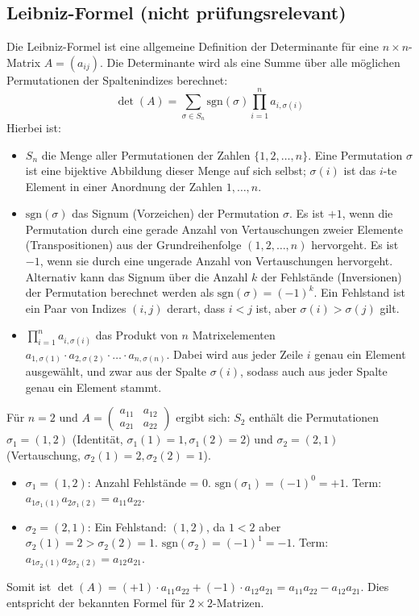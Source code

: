 \subsection{Leibniz-Formel (nicht prüfungsrelevant)}

Die Leibniz-Formel ist eine allgemeine Definition der Determinante für eine $n
    \times n$-Matrix $A=(a_{ij})$. Die Determinante wird als eine Summe über alle
möglichen Permutationen der Spaltenindizes berechnet:
\[ \det(A) = \sum_{\sigma \in S_n} \text{sgn}(\sigma) \prod_{i=1}^{n} a_{i, \sigma(i)} \]
Hierbei ist:
\begin{itemize}
    \item $S_n$ die Menge aller Permutationen der Zahlen $\{1, 2, \ldots, n\}$. Eine Permutation $\sigma$ ist eine bijektive Abbildung dieser Menge auf sich selbst; $\sigma(i)$ ist das $i$-te Element in einer Anordnung der Zahlen $1, \ldots, n$.
    \item $\text{sgn}(\sigma)$ das Signum (Vorzeichen) der Permutation $\sigma$. Es ist $+1$, wenn die Permutation durch eine gerade Anzahl von Vertauschungen zweier Elemente (Transpositionen) aus der Grundreihenfolge $(1, 2, \ldots, n)$ hervorgeht. Es ist $-1$, wenn sie durch eine ungerade Anzahl von Vertauschungen hervorgeht. Alternativ kann das Signum über die Anzahl $k$ der Fehlstände (Inversionen) der Permutation berechnet werden als $\text{sgn}(\sigma) = (-1)^k$. Ein Fehlstand ist ein Paar von Indizes $(i,j)$ derart, dass $i < j$ ist, aber $\sigma(i) > \sigma(j)$ gilt.
    \item $\prod_{i=1}^{n} a_{i, \sigma(i)}$ das Produkt von $n$ Matrixelementen $a_{1, \sigma(1)} \cdot a_{2, \sigma(2)} \cdot \ldots \cdot a_{n, \sigma(n)}$. Dabei wird aus jeder Zeile $i$ genau ein Element ausgewählt, und zwar aus der Spalte $\sigma(i)$, sodass auch aus jeder Spalte genau ein Element stammt.
\end{itemize}
Für $n=2$ und $A = \begin{pmatrix} a_{11} & a_{12} \\ a_{21} & a_{22} \end{pmatrix}$ ergibt sich: $S_2$ enthält die Permutationen $\sigma_1 = (1,2)$ (Identität, $\sigma_1(1)=1, \sigma_1(2)=2$) und $\sigma_2 = (2,1)$ (Vertauschung, $\sigma_2(1)=2, \sigma_2(2)=1$).
\begin{itemize}
    \item $\sigma_1 = (1,2)$: Anzahl Fehlstände = 0. $\text{sgn}(\sigma_1)=(-1)^0=+1$. Term: $a_{1\sigma_1(1)}a_{2\sigma_1(2)} = a_{11}a_{22}$.
    \item $\sigma_2 = (2,1)$: Ein Fehlstand: $(1,2)$, da $1<2$ aber $\sigma_2(1)=2 > \sigma_2(2)=1$. $\text{sgn}(\sigma_2)=(-1)^1=-1$. Term: $a_{1\sigma_2(1)}a_{2\sigma_2(2)} = a_{12}a_{21}$.
\end{itemize}
Somit ist $\det(A) = (+1) \cdot a_{11}a_{22} + (-1) \cdot a_{12}a_{21} = a_{11}a_{22} - a_{12}a_{21}$. Dies entspricht der bekannten Formel für $2 \times 2$-Matrizen.

